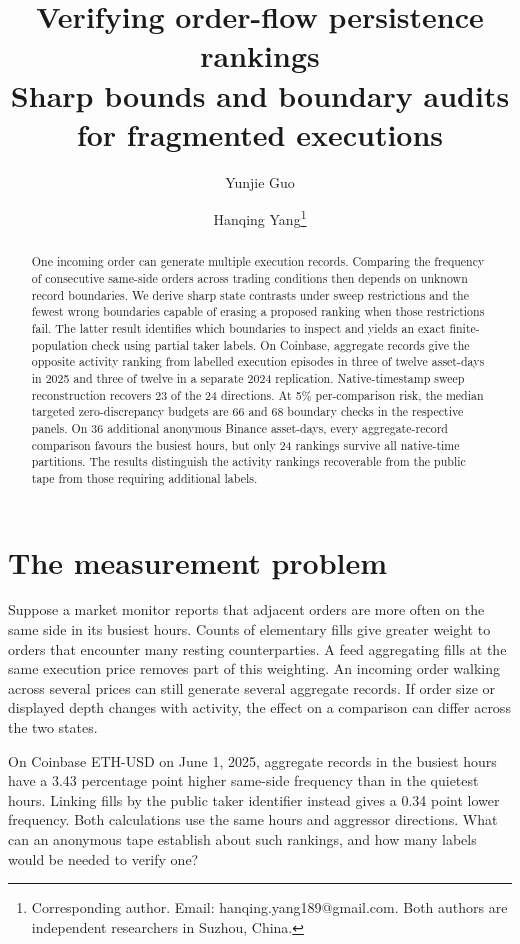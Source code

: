\documentclass[11pt]{article}
\title{Verifying order-flow persistence rankings\\[3pt]\large Sharp bounds and boundary audits for fragmented executions}
\author{Yunjie Guo \and Hanqing Yang\thanks{Corresponding author. Email: hanqing.yang189@gmail.com. Both authors are independent researchers in Suzhou, China.}}
\date{}
\begin{document}
\maketitle
\begin{abstract}
One incoming order can generate multiple execution records. Comparing the frequency of consecutive same-side orders across trading conditions then depends on unknown record boundaries. We derive sharp state contrasts under sweep restrictions and the fewest wrong boundaries capable of erasing a proposed ranking when those restrictions fail. The latter result identifies which boundaries to inspect and yields an exact finite-population check using partial taker labels. On Coinbase, aggregate records give the opposite activity ranking from labelled execution episodes in three of twelve asset-days in 2025 and three of twelve in a separate 2024 replication. Native-timestamp sweep reconstruction recovers 23 of the 24 directions. At 5\% per-comparison risk, the median targeted zero-discrepancy budgets are 66 and 68 boundary checks in the respective panels. On 36 additional anonymous Binance asset-days, every aggregate-record comparison favours the busiest hours, but only 24 rankings survive all native-time partitions. The results distinguish the activity rankings recoverable from the public tape from those requiring additional labels.
\end{abstract}

\section{The measurement problem}
Suppose a market monitor reports that adjacent orders are more often on the same side in its busiest hours. Counts of elementary fills give greater weight to orders that encounter many resting counterparties. A feed aggregating fills at the same execution price removes part of this weighting. An incoming order walking across several prices can still generate several aggregate records. If order size or displayed depth changes with activity, the effect on a comparison can differ across the two states.

On Coinbase ETH-USD on June 1, 2025, aggregate records in the busiest hours have a 3.43 percentage point higher same-side frequency than in the quietest hours. Linking fills by the public taker identifier instead gives a 0.34 point lower frequency. Both calculations use the same hours and aggressor directions. What can an anonymous tape establish about such rankings, and how many labels would be needed to verify one?
\end{document}
